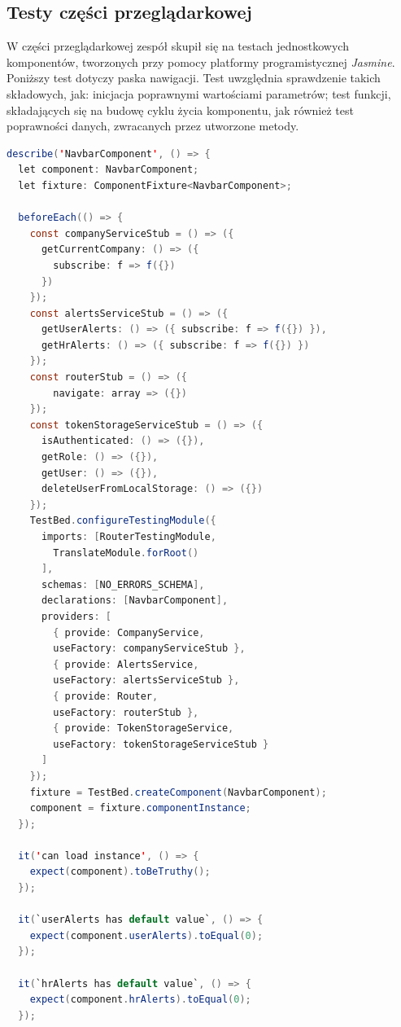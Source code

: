 \documentclass[twoside]{projektInzynierskiMS}
\numberwithin{figure}{section}
\begin{document}
\subsection{Testy części przeglądarkowej}
W części przeglądarkowej zespół skupił się na testach jednostkowych komponentów, tworzonych przy pomocy platformy programistycznej \textit{Jasmine}. Poniższy test dotyczy paska nawigacji. Test uwzględnia sprawdzenie takich składowych, jak: inicjacja poprawnymi wartościami parametrów; test funkcji, składających się na budowę cyklu życia komponentu, jak również test poprawności danych, zwracanych przez utworzone metody.

\begin{lstlisting}[language=Java,caption=Testy jednostkowe aplikacji przeglądarkowej. Źródło: Opracowanie własne.,captionpos=b]
describe('NavbarComponent', () => {
  let component: NavbarComponent;
  let fixture: ComponentFixture<NavbarComponent>;

  beforeEach(() => {
    const companyServiceStub = () => ({
      getCurrentCompany: () => ({ 
        subscribe: f => f({}) 
      })
    });
    const alertsServiceStub = () => ({
      getUserAlerts: () => ({ subscribe: f => f({}) }),
      getHrAlerts: () => ({ subscribe: f => f({}) })
    });
    const routerStub = () => ({ 
        navigate: array => ({}) 
    });
    const tokenStorageServiceStub = () => ({
      isAuthenticated: () => ({}),
      getRole: () => ({}),
      getUser: () => ({}),
      deleteUserFromLocalStorage: () => ({})
    });
    TestBed.configureTestingModule({
      imports: [RouterTestingModule,
        TranslateModule.forRoot()
      ],
      schemas: [NO_ERRORS_SCHEMA],
      declarations: [NavbarComponent],
      providers: [
        { provide: CompanyService, 
        useFactory: companyServiceStub },
        { provide: AlertsService, 
        useFactory: alertsServiceStub },
        { provide: Router,
        useFactory: routerStub },
        { provide: TokenStorageService, 
        useFactory: tokenStorageServiceStub }
      ]
    });
    fixture = TestBed.createComponent(NavbarComponent);
    component = fixture.componentInstance;
  });

  it('can load instance', () => {
    expect(component).toBeTruthy();
  });

  it(`userAlerts has default value`, () => {
    expect(component.userAlerts).toEqual(0);
  });

  it(`hrAlerts has default value`, () => {
    expect(component.hrAlerts).toEqual(0);
  });


\end{lstlisting}
\end{document}
